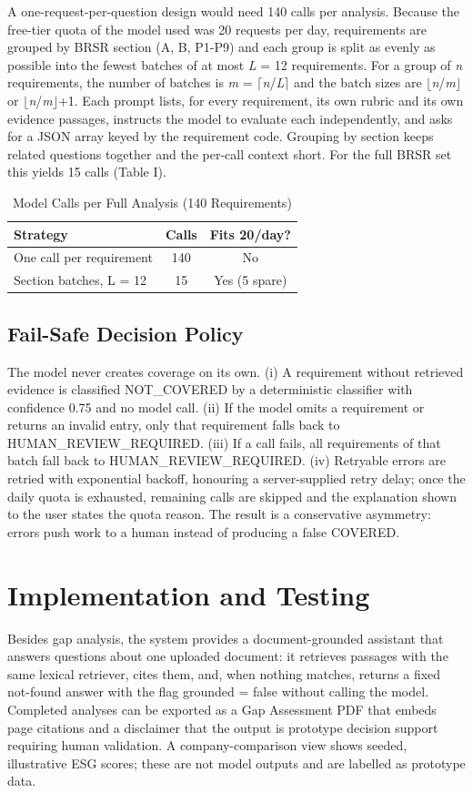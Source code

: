 \documentclass[conference]{IEEEtran}
\begin{document}
A one-request-per-question design would need 140 calls per analysis. Because the free-tier quota of the model used was 20 requests per day, requirements are grouped by BRSR section (A, B, P1-P9) and each group is split as evenly as possible into the fewest batches of at most \textit{L} = 12 requirements. For a group of \textit{n} requirements, the number of batches is \textit{m} = $\lceil$\textit{n}/\textit{L}$\rceil$ and the batch sizes are $\lfloor$\textit{n}/\textit{m}$\rfloor$ or $\lfloor$\textit{n}/\textit{m}$\rfloor$+1. Each prompt lists, for every requirement, its own rubric and its own evidence passages, instructs the model to evaluate each independently, and asks for a JSON array keyed by the requirement code. Grouping by section keeps related questions together and the per-call context short. For the full BRSR set this yields 15 calls (Table I).

\begin{table}[!t]\centering\caption{Model Calls per Full Analysis (140 Requirements)}
\footnotesize\begin{tabular}{lcc}\toprule
Strategy & Calls & Fits 20/day? \\ \midrule
One call per requirement & 140 & No \\
Section batches, L = 12 & 15 & Yes (5 spare) \\
\bottomrule\end{tabular}
\end{table}
\subsection{Fail-Safe Decision Policy}
The model never creates coverage on its own. (i) A requirement without retrieved evidence is classified NOT\_COVERED by a deterministic classifier with confidence 0.75 and no model call. (ii) If the model omits a requirement or returns an invalid entry, only that requirement falls back to HUMAN\_REVIEW\_REQUIRED. (iii) If a call fails, all requirements of that batch fall back to HUMAN\_REVIEW\_REQUIRED. (iv) Retryable errors are retried with exponential backoff, honouring a server-supplied retry delay; once the daily quota is exhausted, remaining calls are skipped and the explanation shown to the user states the quota reason. The result is a conservative asymmetry: errors push work to a human instead of producing a false COVERED.

\section{Implementation and Testing}
Besides gap analysis, the system provides a document-grounded assistant that answers questions about one uploaded document: it retrieves passages with the same lexical retriever, cites them, and, when nothing matches, returns a fixed not-found answer with the flag grounded = false without calling the model. Completed analyses can be exported as a Gap Assessment PDF that embeds page citations and a disclaimer that the output is prototype decision support requiring human validation. A company-comparison view shows seeded, illustrative ESG scores; these are not model outputs and are labelled as prototype data.
\end{document}
